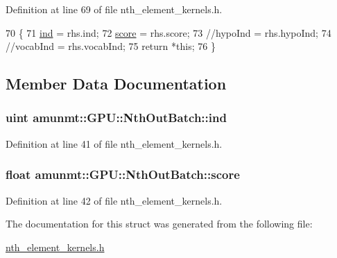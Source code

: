 Definition at line 69 of file nth\+\_\+element\+\_\+kernels.\+h.


\begin{DoxyCode}
70   \{
71     \hyperlink{structamunmt_1_1GPU_1_1NthOutBatch_aa792e473d4d680f6a156771ce0045de6}{ind} = rhs.ind;
72     \hyperlink{structamunmt_1_1GPU_1_1NthOutBatch_ad06596d1cdfd717be7e29e2e5732aad8}{score} = rhs.score;
73     \textcolor{comment}{//hypoInd = rhs.hypoInd;}
74     \textcolor{comment}{//vocabInd = rhs.vocabInd;}
75     \textcolor{keywordflow}{return} *\textcolor{keyword}{this};
76   \}
\end{DoxyCode}


\subsection{Member Data Documentation}
\subsubsection[{\texorpdfstring{ind}{ind}}]{\setlength{\rightskip}{0pt plus 5cm}uint amunmt\+::\+G\+P\+U\+::\+Nth\+Out\+Batch\+::ind}\hypertarget{structamunmt_1_1GPU_1_1NthOutBatch_aa792e473d4d680f6a156771ce0045de6}{}\label{structamunmt_1_1GPU_1_1NthOutBatch_aa792e473d4d680f6a156771ce0045de6}


Definition at line 41 of file nth\+\_\+element\+\_\+kernels.\+h.

\subsubsection[{\texorpdfstring{score}{score}}]{\setlength{\rightskip}{0pt plus 5cm}float amunmt\+::\+G\+P\+U\+::\+Nth\+Out\+Batch\+::score}\hypertarget{structamunmt_1_1GPU_1_1NthOutBatch_ad06596d1cdfd717be7e29e2e5732aad8}{}\label{structamunmt_1_1GPU_1_1NthOutBatch_ad06596d1cdfd717be7e29e2e5732aad8}


Definition at line 42 of file nth\+\_\+element\+\_\+kernels.\+h.



The documentation for this struct was generated from the following file\+:\begin{DoxyCompactItemize}
\item 
\hyperlink{nth__element__kernels_8h}{nth\+\_\+element\+\_\+kernels.\+h}\end{DoxyCompactItemize}
